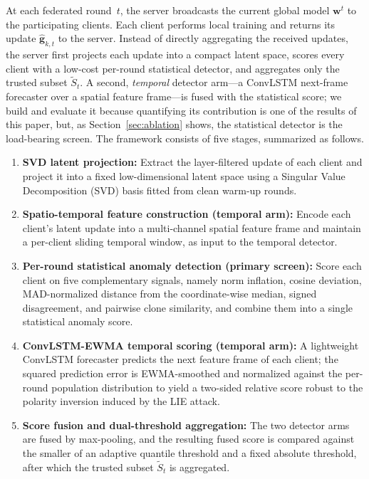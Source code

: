 \documentclass[journal]{IEEEtran}
\begin{document}
At each federated round~$t$, the server broadcasts the current global model $\mathbf{w}^t$ to the participating clients. Each client performs local training and returns its update $\hat{\mathbf{g}}_{k,t}$ to the server. Instead of directly aggregating the received updates, the server first projects each update into a compact latent space, scores every client with a low-cost per-round statistical detector, and aggregates only the trusted subset $\widetilde{S}_t$. A second, \emph{temporal} detector arm---a ConvLSTM next-frame forecaster over a spatial feature frame---is fused with the statistical score; we build and evaluate it because quantifying its contribution is one of the results of this paper, but, as Section~\ref{sec:ablation} shows, the statistical detector is the load-bearing screen. The framework consists of five stages, summarized as follows.
\begin{enumerate}
    \item \textbf{SVD latent projection:} Extract the layer-filtered update of each client and project it into a fixed low-dimensional latent space using a Singular Value Decomposition (SVD) basis fitted from clean warm-up rounds.
    \item \textbf{Spatio-temporal feature construction (temporal arm):} Encode each client's latent update into a multi-channel spatial feature frame and maintain a per-client sliding temporal window, as input to the temporal detector.
    \item \textbf{Per-round statistical anomaly detection (primary screen):} Score each client on five complementary signals, namely norm inflation, cosine deviation, MAD-normalized distance from the coordinate-wise median, signed disagreement, and pairwise clone similarity, and combine them into a single statistical anomaly score.
    \item \textbf{ConvLSTM-EWMA temporal scoring (temporal arm):} A lightweight ConvLSTM forecaster predicts the next feature frame of each client; the squared prediction error is EWMA-smoothed and normalized against the per-round population distribution to yield a two-sided relative score robust to the polarity inversion induced by the LIE attack.
    \item \textbf{Score fusion and dual-threshold aggregation:} The two detector arms are fused by max-pooling, and the resulting fused score is compared against the smaller of an adaptive quantile threshold and a fixed absolute threshold, after which the trusted subset $\widetilde{S}_t$ is aggregated.
\end{enumerate}
\end{document}
